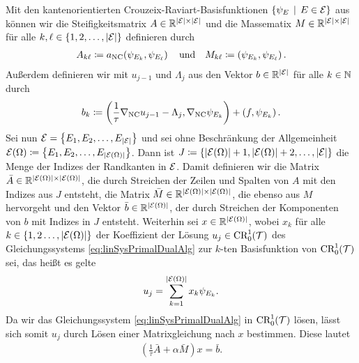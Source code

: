 \begin{remark} 
  \label{rem:primalDualMatrixEquations}
  Mit den kantenorientierten Crouzeix-Raviart-Basisfunktionen
  $\{\psi_E\,\mid\,E\in\mathcal{E}\}$ aus  können
  wir die Steifigkeitsmatrix $A\in\mathbb{R}^{|\mathcal{E}|\times|\mathcal{E}|}$ und die
  Massematix $M\in\mathbb{R}^{|\mathcal{E}|\times|\mathcal{E}|}$ für alle
  $k,\ell\in\{1,2,\ldots,|\mathcal{E}|\}$ definieren durch
  \begin{align*}
    A_{k\ell}\coloneqq a_\textup{NC}\!\left(\psi_{E_k},\psi_{E_\ell}\right)
    \quad\text{und}\quad
    M_{k\ell}\coloneqq \left(\psi_{E_k},\psi_{E_\ell}\right).
  \end{align*}
  Außerdem definieren wir mit $u_{j-1}$ und $\Lambda_j$ aus
   den Vektor $b\in\mathbb{R}^{|\mathcal{E}|}$ für alle
  $k\in\mathbb{N}$ durch
  \begin{align*}
    b_k\coloneqq 
    \left(\frac{1}{\tau}\nabla_\textup{NC} u_{j-1}-\Lambda_j,\nabla_\textup{NC}\psi_{E_k}\right)
    + \left( f,\psi_{E_k} \right).
  \end{align*}
  Sei nun $\mathcal{E}=\left\{E_1,E_2,\ldots,E_{|\mathcal{E}|}\right\}$ und sei ohne
  Beschränkung der Allgemeinheit 
  $\mathcal{E}(\Omega)\coloneqq\left\{E_1,E_2,\ldots,E_{|\mathcal{E}(\Omega)|}\right\}$.  
  Dann ist $J\coloneqq\{|\mathcal{E}(\Omega)|+1,|\mathcal{E}(\Omega)|+2,\ldots,|\mathcal{E}|\}$
  die Menge der Indizes der Randkanten in $\mathcal{E}$.
  Damit definieren wir die Matrix $\bar
  A\in\mathbb{R}^{|\mathcal{E}(\Omega)|\times|\mathcal{E}(\Omega)|}$, die durch Streichen der
  Zeilen und Spalten von $A$ mit den Indizes aus $J$ entsteht, die Matrix $\bar
  M\in\mathbb{R}^{|\mathcal{E}(\Omega)|\times|\mathcal{E}(\Omega)|}$, die ebenso aus $M$
  hervorgeht und den Vektor $\bar b\in\mathbb{R}^{|\mathcal{E}(\Omega)|}$, der durch
  Streichen der Komponenten von $b$ mit Indizes in $J$ entsteht.
  Weiterhin sei $x\in\mathbb{R}^{|\mathcal{E}(\Omega)|}$, wobei $x_k$ für alle
  $k\in\{1,2\ldots,|\mathcal{E}(\Omega)|\}$ der Koeffizient der Lösung 
  $u_j\in\textup{CR}^1_0(\mathcal{T})$ des
  Gleichungssystems \eqref{eq:linSysPrimalDualAlg} zur $k$-ten Basisfunktion
  von $\textup{CR}^1_0(\mathcal{T})$ sei, das heißt es gelte
  \begin{align*}
    u_j=\sum_{k=1}^{|\mathcal{E}(\Omega)|} x_k\psi_{E_k}.
  \end{align*}
  Da wir das Gleichungssystem \eqref{eq:linSysPrimalDualAlg} in
  $\textup{CR}^1_0(\mathcal{T})$ lösen, lässt sich somit $u_j$ durch Lösen einer
  Matrixgleichung nach $x$ bestimmen. 
  Diese lautet
  \begin{align}
    \label{eq:linSysPrimalDualAlgMatrixEq}
    \left(\frac{1}{\tau}\bar A+\alpha \bar M\right)x=\bar b.
  \end{align}
\end{remark}

